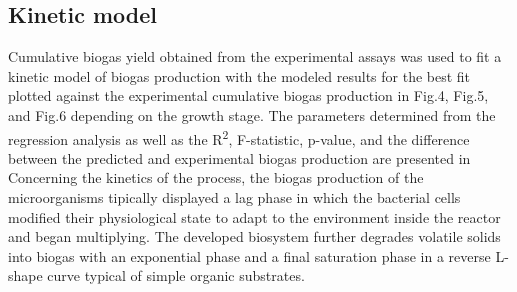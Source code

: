 \subsection{Kinetic model}
Cumulative biogas yield obtained from the experimental assays was used to fit a kinetic model of biogas production with the modeled results for the best fit plotted against the experimental cumulative biogas production in Fig.4, Fig.5, and Fig.6 depending on the growth stage. The parameters determined from the regression analysis as well as the R\textsuperscript{2}, F-statistic, p-value, and the difference between the predicted and experimental biogas production are presented in 
Concerning the kinetics of the process, the biogas production of the microorganisms tipically displayed a lag phase in which the bacterial cells modified their physiological state to adapt to the environment inside the reactor and began multiplying. The developed biosystem further degrades volatile solids into biogas with an exponential phase and a final saturation phase in a reverse L-shape curve typical of simple organic substrates.  
